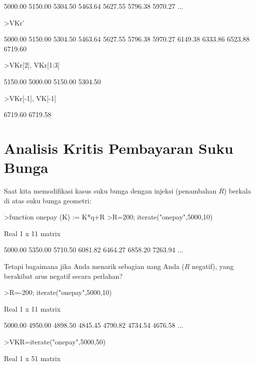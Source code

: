 \documentclass[a4paper,11pt,oneside,enabledeprecatedfontcommands]{scrbook}
\newenvironment{eulernotebook}{}{}
\newcommand{\eulerheading}[1]{\chapter{#1}}
\newenvironment{eulercomment}{\par\medskip\noindent}{\par\medskip}
\begin{document}
\begin{eulernotebook}
\begin{euleroutput}
    5000.00     5150.00     5304.50     5463.64     5627.55     5796.38     5970.27     ...
\end{euleroutput}
\begin{eulerprompt}
>VKr'
\end{eulerprompt}
\begin{euleroutput}
    5000.00 
    5150.00 
    5304.50 
    5463.64 
    5627.55 
    5796.38 
    5970.27 
    6149.38 
    6333.86 
    6523.88 
    6719.60 
\end{euleroutput}
\begin{eulerprompt}
>VKr[2], VKr[1:3]
\end{eulerprompt}
\begin{euleroutput}
    5150.00 
    5000.00     5150.00     5304.50 
\end{euleroutput}
\begin{eulerprompt}
>VKr[-1], VK[-1]
\end{eulerprompt}
\begin{euleroutput}
    6719.60 
    6719.58 
\end{euleroutput}

\eulerheading{Analisis Kritis Pembayaran Suku Bunga}
\begin{eulercomment}
Saat kita memodifikasi kasus suku bunga dengan injeksi (penambahan $R$) berkala di atas suku bunga geometri:
\end{eulercomment}
\begin{eulerprompt}
>function onepay (K) := K*q+R
>R=200; iterate("onepay",5000,10)
\end{eulerprompt}
\begin{euleroutput}
Real 1 x 11 matrix

    5000.00     5350.00     5710.50     6081.82     6464.27     6858.20     7263.94     ...
\end{euleroutput}
\begin{eulercomment}
Tetapi bagaimana jika Anda menarik sebagian uang Anda ($R$ negatif), yang berakibat arus negatif secara perlahan?
\end{eulercomment}
\begin{eulerprompt}
>R=-200; iterate("onepay",5000,10)
\end{eulerprompt}
\begin{euleroutput}
Real 1 x 11 matrix

    5000.00     4950.00     4898.50     4845.45     4790.82     4734.54     4676.58     ...
\end{euleroutput}
\begin{eulerprompt}
>VKR=iterate("onepay",5000,50)
\end{eulerprompt}
\begin{euleroutput}
Real 1 x 51 matrix


\end{euleroutput}
\end{eulernotebook}
\end{document}
